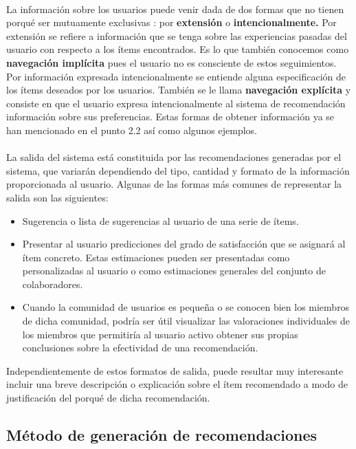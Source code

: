 \documentclass[12pt,letterpaper,oneside] {memoir}
\begin{document}
\paragraph{}
La información sobre los usuarios puede venir dada de dos formas que no tienen porqué ser mutuamente exclusivas \citep{Yager2003}: por \textbf{extensión} o \textbf{intencionalmente.} Por extensión se refiere a información que se tenga sobre las experiencias pasadas del usuario con respecto a los ítems encontrados. Es lo que también conocemos como \textbf{navegación implícita} pues el usuario no es consciente de estos seguimientos. Por información expresada intencionalmente se entiende alguna especificación de los ítems deseados por los usuarios. También se le llama \textbf{navegación explícita} y consiste en que el usuario expresa intencionalmente al sistema de recomendación información sobre sus preferencias.
Estas formas de obtener información ya se han mencionado en el punto 2.2 así como algunos ejemplos.
\paragraph{}
La salida del sistema está constituida por las recomendaciones generadas por el sistema, que variarán dependiendo del tipo, cantidad y formato de la información proporcionada al usuario. Algunas de las formas más comunes de representar la salida son las siguientes:

\begin{itemize}
\item Sugerencia o lista de sugerencias al usuario de una serie de ítems.
\item Presentar al usuario predicciones del grado de satisfacción que se asignará al ítem concreto. Estas estimaciones pueden ser presentadas como personalizadas al usuario o como estimaciones generales del conjunto de colaboradores.
\item Cuando la comunidad de usuarios es pequeña o se conocen bien los miembros de dicha comunidad, podría ser útil visualizar las valoraciones individuales de los miembros que permitiría al usuario activo obtener sus propias conclusiones sobre la efectividad de una recomendación.
\end{itemize}

Independientemente de estos formatos de salida, puede resultar muy interesante incluir una breve descripción o explicación sobre el ítem recomendado a modo de justificación del porqué de dicha recomendación.

\subsection{Método de generación de recomendaciones}
\end{document}
